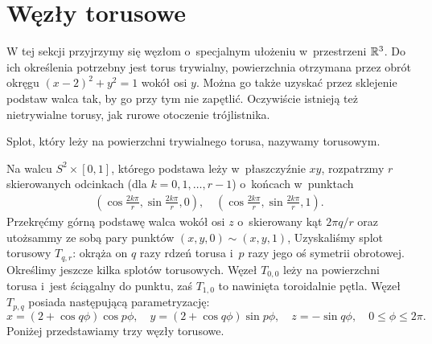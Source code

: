 
\section{Węzły torusowe}
%

W tej sekcji przyjrzymy się węzłom o~specjalnym ułożeniu w~przestrzeni $\mathbb R^3$.
Do ich określenia potrzebny jest torus trywialny, powierzchnia otrzymana przez obrót okręgu $(x-2)^2 + y^2 = 1$ wokół osi $y$.
Można go także uzyskać przez sklejenie podstaw walca tak, by go przy tym nie zapętlić.
Oczywiście istnieją też nietrywialne torusy, jak rurowe otoczenie trójlistnika.

\begin{definition}
    Splot, który leży na powierzchni trywialnego torusa, nazywamy torusowym.
\end{definition}

Na walcu $S^2 \times [0,1]$, którego podstawa leży w~płaszczyźnie $xy$, rozpatrzmy $r$ skierowanych odcinkach (dla $k = 0, 1, \ldots, r - 1$) o~końcach w~punktach
\begin{align*}
    \left(\cos \frac{2k \pi}{r}, \sin \frac{2k\pi}{r}, 0 \right), \quad
    \left(\cos \frac{2k \pi}{r}, \sin \frac{2k\pi}{r}, 1 \right).
\end{align*}
Przekręćmy górną podstawę walca wokół osi $z$ o~skierowany kąt $2\pi q / r$ oraz utożsammy ze sobą pary punktów $(x, y, 0) \sim (x, y, 1)$,
Uzyskaliśmy splot torusowy $T_{q, r}$: okrąża on $q$ razy rdzeń torusa i~$p$ razy jego oś symetrii obrotowej.
Określimy jeszcze kilka splotów torusowych.
Węzeł $T_{0, 0}$ leży na powierzchni torusa i~jest ściągalny do punktu, zaś $T_{1, 0}$ to nawinięta toroidalnie pętla.
Węzeł $T_{p, q}$ posiada następującą parametryzację:
\[
    x = (2+\cos q \phi) \cos p \phi, \quad
    y = (2+\cos q \phi) \sin p \phi, \quad
    z = - \sin q \phi, \quad
    0 \le \phi \le 2\pi.
\]
Poniżej przedstawiamy trzy węzły torusowe.

